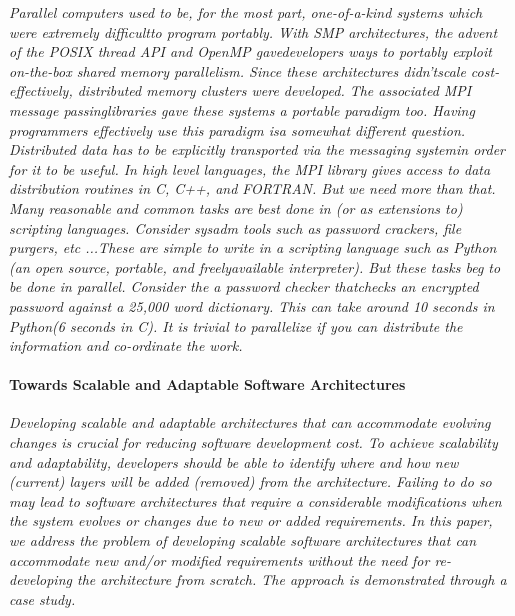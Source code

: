 \documentclass{article}
\begin{document}
\emph{Parallel computers used to be, for the most part, one-of-a-kind systems
which were extremely difficultto program portably. With SMP architectures, the
advent of the POSIX thread API and OpenMP gavedevelopers ways to portably
exploit on-the-box shared memory parallelism. Since these architectures
didn’tscale cost-effectively, distributed memory clusters were developed. The
associated MPI message passinglibraries gave these systems a portable paradigm
too. Having programmers effectively use this paradigm isa somewhat different
question. Distributed data has to be explicitly transported via the messaging
systemin order for it to be useful. In high level languages, the MPI library
gives access to data distribution routines in C, C++, and FORTRAN. But we need
more than that. Many reasonable and common tasks are best done in (or as
extensions to) scripting languages. Consider sysadm tools such as password
crackers, file purgers, etc ...These are simple to write in a scripting
language such as Python (an open source, portable, and freelyavailable
interpreter). But these tasks beg to be done in parallel. Consider the a
password checker thatchecks an encrypted password against a 25,000 word
dictionary. This can take around 10 seconds in Python(6 seconds in C). It is
trivial to parallelize if you can distribute the information and co-ordinate
the work.}

\paragraph{Towards Scalable and Adaptable Software Architectures} \cite{fayad2005towards}

\emph{Developing scalable and adaptable architectures that can accommodate
evolving changes is crucial for reducing software development cost. To achieve
scalability and adaptability, developers should be able to identify where and
how new (current) layers will be added (removed) from the architecture.
Failing to do so may lead to software architectures that require a considerable
modifications when the system evolves or changes due to new or added
requirements. In this paper, we address the problem of developing scalable
software architectures that can accommodate new and/or modified requirements
without the need for re-developing the architecture from scratch. The approach
is demonstrated through a case study.}



\end{document}
